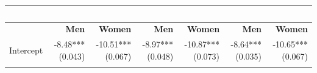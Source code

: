 \documentclass[]{article}
\begin{document}
\begin{longtable}[c]{@{}rrrrrrr@{}}
\begin{minipage}[b]{0.11\columnwidth}
~
\strut\end{minipage}\tabularnewline
\midrule
\endhead
\begin{minipage}[t]{0.12\columnwidth}\raggedleft\strut
\strut\end{minipage} &
\begin{minipage}[t]{0.11\columnwidth}\raggedleft\strut
\textbf{Men}
\strut\end{minipage} &
\begin{minipage}[t]{0.12\columnwidth}\raggedleft\strut
\textbf{Women}
\strut\end{minipage} &
\begin{minipage}[t]{0.11\columnwidth}\raggedleft\strut
\textbf{Men}
\strut\end{minipage} &
\begin{minipage}[t]{0.12\columnwidth}\raggedleft\strut
\textbf{Women}
\strut\end{minipage} &
\begin{minipage}[t]{0.11\columnwidth}\raggedleft\strut
\textbf{Men}
\strut\end{minipage} &
\begin{minipage}[t]{0.11\columnwidth}\raggedleft\strut
\textbf{Women}
\strut\end{minipage}\tabularnewline
\begin{minipage}[t]{0.12\columnwidth}\raggedleft\strut
Intercept
\strut\end{minipage} &
\begin{minipage}[t]{0.11\columnwidth}\raggedleft\strut
-8.48*** (0.043)
\strut\end{minipage} &
\begin{minipage}[t]{0.12\columnwidth}\raggedleft\strut
-10.51*** (0.067)
\strut\end{minipage} &
\begin{minipage}[t]{0.11\columnwidth}\raggedleft\strut
-8.97*** (0.048)
\strut\end{minipage} &
\begin{minipage}[t]{0.12\columnwidth}\raggedleft\strut
-10.87*** (0.073)
\strut\end{minipage} &
\begin{minipage}[t]{0.11\columnwidth}\raggedleft\strut
-8.64*** (0.035)
\strut\end{minipage} &
\begin{minipage}[t]{0.11\columnwidth}\raggedleft\strut
-10.65*** (0.067)
\strut\end{minipage}\tabularnewline
\begin{minipage}[t]{0.12\columnwidth}\raggedleft\strut

\end{minipage}
\end{longtable}
\end{document}
